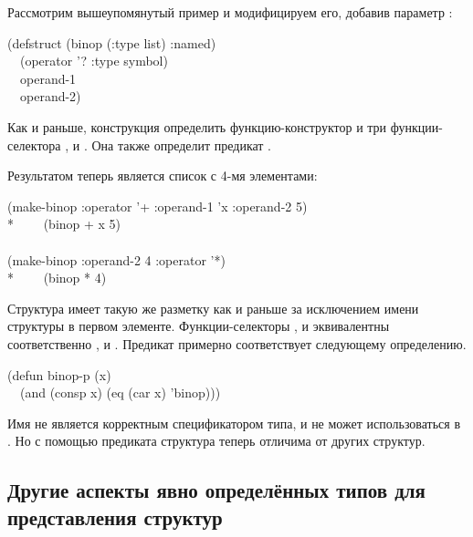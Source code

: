 Рассмотрим вышеупомянутый пример  и модифицируем его, добавив
параметр :
\begin{lisp}
(defstruct (binop (:type list) :named) \\
~~(operator '? :type symbol) \\
~~operand-1 \\
~~operand-2)
\end{lisp}
Как и раньше, конструкция определить функцию-конструктор  и три
функции-селектора  ,  и
. Она также определит предикат .

Результатом  теперь является список с 4-мя элементами:
\begin{lisp}
(make-binop :operator '+ :operand-1 'x :operand-2 5) \\*
~~~\EV\ (binop + x 5) \\
\\
(make-binop :operand-2 4 :operator '*) \\*
~~~\EV\ (binop * {\nil} 4)
\end{lisp}
Структура имеет такую же разметку как и раньше за исключением имени структуры в
первом элементе.
Функции-селекторы
, и  эквивалентны
соответственно ,  и .
Предикат  примерно соответствует следующему определению.
\begin{lisp}
(defun binop-p (x) \\
~~(and (consp x) (eq (car x) 'binop)))
\end{lisp}
Имя  не является корректным спецификатором типа, и не может
использоваться в . Но с помощью предиката структура теперь отличима 
от других структур. 

\subsection{Другие аспекты явно определённых типов для представления структур}
\label{DEFSTRUCT-INITIAL-OFFSET}


